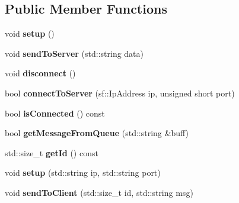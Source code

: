 \subsection*{Public Member Functions}
\begin{DoxyCompactItemize}
\item 
void {\bfseries setup} ()\hypertarget{class_network_manager_a87b64dafa618fac138addfac9c47edab}{}\label{class_network_manager_a87b64dafa618fac138addfac9c47edab}

\item 
void {\bfseries send\+To\+Server} (std\+::string data)\hypertarget{class_network_manager_afdea8bf9d971b63d87bce037b22f41ed}{}\label{class_network_manager_afdea8bf9d971b63d87bce037b22f41ed}

\item 
void {\bfseries disconnect} ()\hypertarget{class_network_manager_a751f87add468a5ddc70c4087ab80533f}{}\label{class_network_manager_a751f87add468a5ddc70c4087ab80533f}

\item 
bool {\bfseries connect\+To\+Server} (sf\+::\+Ip\+Address ip, unsigned short port)\hypertarget{class_network_manager_a449e99629805f4e1ccf6c8d286fb3130}{}\label{class_network_manager_a449e99629805f4e1ccf6c8d286fb3130}

\item 
bool {\bfseries is\+Connected} () const \hypertarget{class_network_manager_ad0425d53b2193738aadf84aebe15125d}{}\label{class_network_manager_ad0425d53b2193738aadf84aebe15125d}

\item 
bool {\bfseries get\+Message\+From\+Queue} (std\+::string \&buff)\hypertarget{class_network_manager_abdc06c2b57a7f67aac0a0ce245c20b2f}{}\label{class_network_manager_abdc06c2b57a7f67aac0a0ce245c20b2f}

\item 
std\+::size\+\_\+t {\bfseries get\+Id} () const \hypertarget{class_network_manager_a2991e733decb07ea45ed9f50a304c90a}{}\label{class_network_manager_a2991e733decb07ea45ed9f50a304c90a}

\item 
void {\bfseries setup} (std\+::string ip, std\+::string port)\hypertarget{class_network_manager_ac0b3e819d194a1bfcabaa40601e16f97}{}\label{class_network_manager_ac0b3e819d194a1bfcabaa40601e16f97}

\item 
void {\bfseries send\+To\+Client} (std\+::size\+\_\+t id, std\+::string msg)\hypertarget{class_network_manager_ac25ae70d60204461bdfc63b51676615c}{}\label{class_network_manager_ac25ae70d60204461bdfc63b51676615c}


\end{DoxyCompactItemize}
